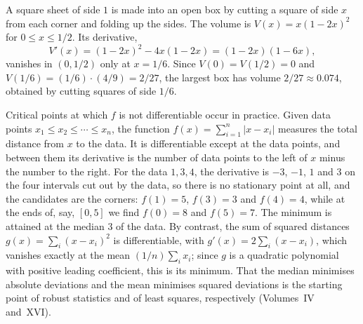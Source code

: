 \begin{figure}
\end{figure}

A square sheet of side $1$ is made into an open box by cutting a square of side $x$ from each corner and folding up the sides. The volume is $V(x)=x(1-2x)^2$ for $0\le x\le1/2$. Its derivative,
\[
V'(x)=(1-2x)^2-4x(1-2x)=(1-2x)(1-6x),
\]
vanishes in $(0,1/2)$ only at $x=1/6$. Since $V(0)=V(1/2)=0$ and $V(1/6)=(1/6)\cdot(4/9)=2/27$, the largest box has volume $2/27\approx0.074$, obtained by cutting squares of side $1/6$.

Critical points at which $f$ is not differentiable occur in practice. Given data points $x_1\le x_2\le\cdots\le x_n$, the function $f(x)=\sum_{i=1}^n|x-x_i|$ measures the total distance from $x$ to the data. It is differentiable except at the data points, and between them its derivative is the number of data points to the left of $x$ minus the number to the right. For the data $1,3,4$, the derivative is $-3$, $-1$, $1$ and $3$ on the four intervals cut out by the data, so there is no stationary point at all, and the candidates are the corners: $f(1)=5$, $f(3)=3$ and $f(4)=4$, while at the ends of, say, $[0,5]$ we find $f(0)=8$ and $f(5)=7$. The minimum is attained at the median $3$ of the data. By contrast, the sum of squared distances $g(x)=\sum_i(x-x_i)^2$ is differentiable, with $g'(x)=2\sum_i(x-x_i)$, which vanishes exactly at the mean $(1/n)\sum_ix_i$; since $g$ is a quadratic polynomial with positive leading coefficient, this is its minimum. That the median minimises absolute deviations and the mean minimises squared deviations is the starting point of robust statistics and of least squares, respectively (Volumes~IV and~XVI).

